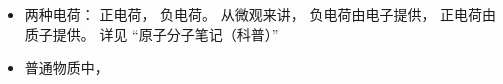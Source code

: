 
\begin{issues}
\issueDraft
\end{issues}

\begin{itemize}
\item 两种电荷： 正电荷， 负电荷。 从微观来讲， 负电荷由电子提供， 正电荷由质子提供。 详见 “原子分子笔记（科普）”
\item 普通物质中， 
\end{itemize}
